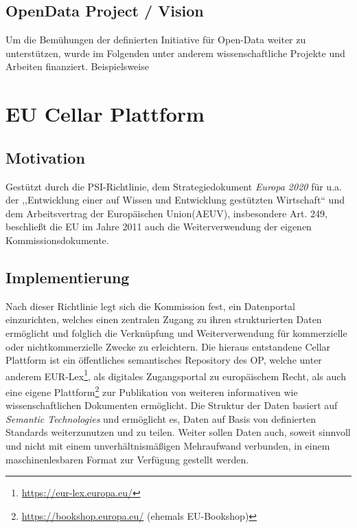         
        \subsection{OpenData Project / Vision}

Um die Bemühungen der definierten Initiative für Open-Data weiter zu unterstützen, wurde im Folgenden unter anderem wissenschaftliche Projekte und Arbeiten finanziert.
Beispielsweise 



        
        \pagebreak
        \section{EU Cellar Plattform}

        \subsection{Motivation}
        
Gestützt durch die PSI-Richtlinie, dem Strategiedokument \textit{Europa 2020} für u.a. der ,,Entwicklung einer auf Wissen und Entwicklung gestützten Wirtschaft`` und dem Arbeitsvertrag der Europäischen Union(AEUV), insbesondere Art. 249, beschließt die EU im Jahre 2011 auch die Weiterverwendung der eigenen Kommissionsdokumente. \cite[ErwG. 1]{2011D0833}

        \subsection{Implementierung}

Nach dieser Richtlinie legt sich die Kommission fest, ein Datenportal einzurichten, welches einen zentralen Zugang zu ihren strukturierten Daten ermöglicht und folglich die Verknüpfung und Weiterverwendung für kommerzielle oder nichtkommerzielle Zwecke zu erleichtern. \cite[Art. 5]{2011D0833}
Die hieraus entstandene Cellar Plattform ist ein öffentliches semantisches Repository des \ac{OP}, welche unter anderem EUR-Lex\footnote{\href{https://eur-lex.europa.eu/homepage.html?locale=de}{https://eur-lex.europa.eu/}}, als digitales Zugangsportal zu europäischem Recht, als auch eine eigene Plattform\footnote{\href{https://bookshop.europa.eu/}{https://bookshop.europa.eu/} (ehemals EU-Bookshop)} zur Publikation von weiteren informativen wie wissenschaftlichen Dokumenten ermöglicht.
Die Struktur der Daten basiert auf \textit{Semantic Technologies} und ermöglicht es, Daten auf Basis von definierten Standards weiterzunutzen und zu teilen. \cite[5]{eu_cellar}
Weiter sollen Daten auch, soweit sinnvoll und nicht mit einem unverhältnismäßigen Mehraufwand verbunden, in einem maschinenlesbaren Format zur Verfügung gestellt werden. \cite[Art. 8 Abs. 1f]{2011D0833}

